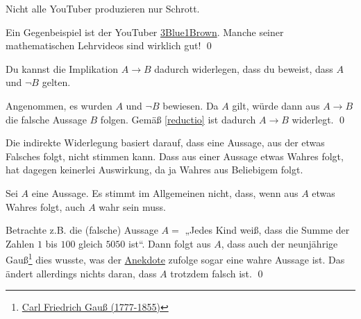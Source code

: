  
 
 \begin{bsp}
Nicht alle YouTuber produzieren nur Schrott.
  \end{bsp}
  \begin{bew}
Ein Gegenbeispiel ist der YouTuber \href{https://www.youtube.com/channel/UCYO_jab_esuFRV4b17AJtAw}{3Blue1Brown}. Manche seiner mathematischen Lehrvideos sind wirklich gut! \qed
  \end{bew}

  

 \begin{sat}
Du kannst die Implikation $A\to B$ dadurch widerlegen, dass du beweist, dass $A$ und $\neg B$ gelten.
 \end{sat}
 \begin{bew}
Angenommen, es wurden $A$ und $\neg B$ bewiesen. Da $A$ gilt, würde dann aus $A\to B$ die falsche Aussage $B$ folgen. Gemäß \cref{reductio} ist dadurch $A\to B$ widerlegt. \qed
 \end{bew}
 
 
 Die indirekte Widerlegung basiert darauf, dass eine Aussage, aus der etwas Falsches folgt, nicht stimmen kann. Dass aus einer Aussage etwas Wahres folgt, hat dagegen keinerlei Auswirkung, da ja Wahres aus Beliebigem folgt.
\begin{bsp}
Sei $A$ eine Aussage. Es stimmt im Allgemeinen nicht, dass, wenn aus $A$ etwas Wahres folgt, auch $A$ wahr sein muss.
\end{bsp}
\begin{bew}
 Betrachte z.B. die (falsche) Aussage $A=$ „Jedes Kind weiß, dass die Summe der Zahlen $1$ bis $100$ gleich $5050$ ist“. Dann folgt aus $A$, dass auch der neunjährige Gauß\footnote{\href{https://de.wikipedia.org/wiki/Carl_Friedrich_Gau\%C3\%9F}{Carl Friedrich Gauß (1777-1855)}} dies wusste, was der \href{https://de.wikipedia.org/wiki/Gau%C3%9Fsche_Summenformel#Herkunft_der_Bezeichnung}{Anekdote} zufolge sogar eine wahre Aussage ist. Das ändert allerdings nichts daran, dass $A$ trotzdem falsch ist. \qed
\end{bew}



